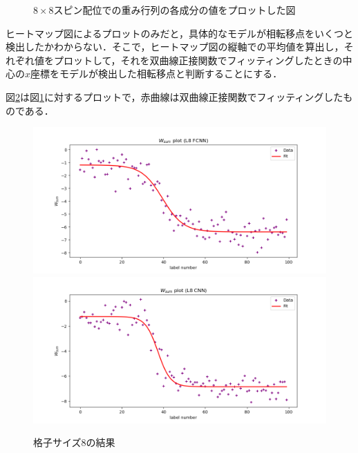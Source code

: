 \documentclass[a4paper,11pt]{jsreport}
\begin{document}
\begin{figure}[H]
\begin{minipage}[b]{0.45\linewidth}
\begin{center}
    \end{center}
  \end{minipage}
  \caption{$8 \times 8$スピン配位での重み行列の各成分の値をプロットした図}
  \label{温度測定器ヒートマップ8}
\end{figure}

ヒートマップ図によるプロットのみだと，具体的なモデルが相転移点をいくつと検出したかわからない．そこで，ヒートマップ図の縦軸での平均値を算出し，それぞれ値をプロットして，それを双曲線正接関数でフィッティングしたときの中心の$x$座標をモデルが検出した相転移点と判断することにする．\par
図\ref{温度測定器プロット8}は図\ref{温度測定器ヒートマップ8}に対するプロットで，赤曲線は双曲線正接関数でフィッティングしたものである．

\begin{figure}[H]
  \begin{center}
    \includegraphics[width=\linewidth]{image/L8_FCNN_weight_sum.png}
    \includegraphics[width=\linewidth]{image/L8_CNN_weight_sum.png}
  \end{center}
  \caption{格子サイズ8の結果}
  \label{温度測定器プロット8}
\end{figure}
\end{document}
